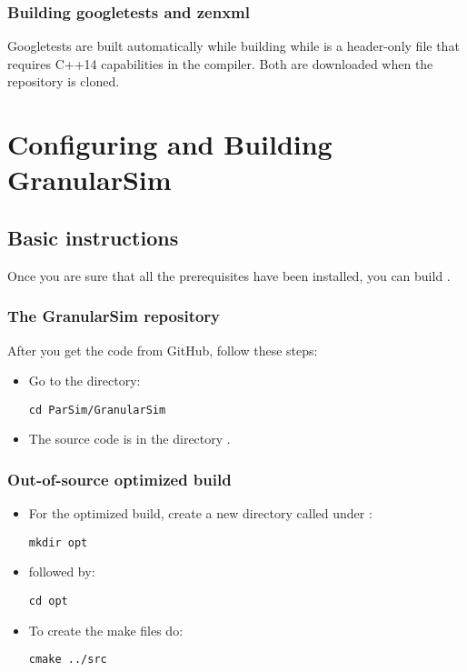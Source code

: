 \documentclass[11pt,fleqn]{book} %
\begin{document}
\subsection{Building googletests and zenxml}
Googletests are built automatically while building  while 
is a header-only file that requires C++14 capabilities in the compiler.  Both are downloaded when the
 repository is cloned.

\chapter{Configuring and Building GranularSim}

\section{Basic instructions}
Once you are sure that all the prerequisites have been installed, you can build \GranularSim.

\subsection{ The GranularSim repository}
After you get the code from GitHub, follow these steps:
\begin{itemize}
  \item Go to the  directory:

\begin{lstlisting}[backgroundcolor=\color{background}]
     cd ParSim/GranularSim
\end{lstlisting}

  \item  The source code is in the directory .
\end{itemize}

\subsection{ Out-of-source optimized build}
\begin{itemize}
  \item For the optimized build, create a new directory called  under :

\begin{lstlisting}[backgroundcolor=\color{background}]
    mkdir opt
\end{lstlisting}

  \item followed by:

\begin{lstlisting}[backgroundcolor=\color{background}]
    cd opt
\end{lstlisting}

  \item To create the make files do:

\begin{lstlisting}[backgroundcolor=\color{background}]
    cmake ../src
\end{lstlisting}
\end{itemize}
\end{document}
